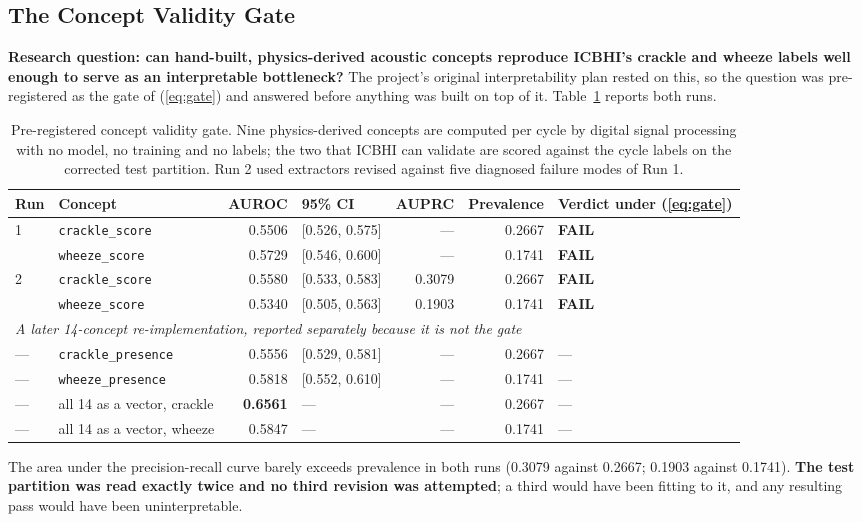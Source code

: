\documentclass[journal,onecolumn]{IEEEtran}
\newcommand{\best}[1]{\textbf{#1}}
\begin{document}
\subsection{The Concept Validity Gate}
\label{subsec:gate}

\textbf{Research question: can hand-built, physics-derived acoustic concepts
reproduce ICBHI's crackle and wheeze labels well enough to serve as an
interpretable bottleneck?} The project's original interpretability plan rested on
this, so the question was pre-registered as the gate of (\ref{eq:gate}) and
answered before anything was built on top of it. Table~\ref{tab:gate} reports both
runs.

\begin{table}[!t]
\centering
\caption{Pre-registered concept validity gate. Nine physics-derived concepts are
computed per cycle by digital signal processing with no model, no training and no
labels; the two that ICBHI can validate are scored against the cycle labels on the
corrected test partition. Run 2 used extractors revised against five diagnosed
failure modes of Run 1.}
\label{tab:gate}
\small
\begin{tabular}{llrlrrl}
\toprule
Run & Concept & AUROC & 95\% CI & AUPRC & Prevalence & Verdict under (\ref{eq:gate}) \\
\midrule
\multirow{2}{*}{1} & \texttt{crackle\_score} & 0.5506 & [0.526, 0.575] & --- & 0.2667 & \best{FAIL} \\
                   & \texttt{wheeze\_score}  & 0.5729 & [0.546, 0.600] & --- & 0.1741 & \best{FAIL} \\
\midrule
\multirow{2}{*}{2} & \texttt{crackle\_score} & 0.5580 & [0.533, 0.583] & 0.3079 & 0.2667 & \best{FAIL} \\
                   & \texttt{wheeze\_score}  & 0.5340 & [0.505, 0.563] & 0.1903 & 0.1741 & \best{FAIL} \\
\midrule
\multicolumn{7}{l}{\emph{A later 14-concept re-implementation, reported separately because it is not the gate}}\\
--- & \texttt{crackle\_presence} & 0.5556 & [0.529, 0.581] & --- & 0.2667 & --- \\
--- & \texttt{wheeze\_presence}  & 0.5818 & [0.552, 0.610] & --- & 0.1741 & --- \\
--- & all 14 as a vector, crackle & \best{0.6561} & --- & --- & 0.2667 & --- \\
--- & all 14 as a vector, wheeze  & 0.5847 & --- & --- & 0.1741 & --- \\
\bottomrule
\end{tabular}

\vspace{2pt}
\footnotesize The area under the precision-recall curve barely exceeds prevalence
in both runs (0.3079 against 0.2667; 0.1903 against 0.1741). \textbf{The test
partition was read exactly twice and no third revision was attempted}; a third
would have been fitting to it, and any resulting pass would have been
uninterpretable.
\end{table}
\end{document}
